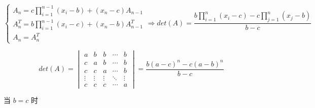 \begin{proposition}[两三角形行列式]
	$$\begin{cases}
	  A_{n} = c\prod\limits_{i=1}^{n-1}(x_{i}-b) + (x_{n} - c)A_{n-1}\\
	  A^{T}_{n} = b\prod\limits_{i=1}^{n-1}(x_{i}-c) + (x_{n} - b)A^{T}_{n-1}\\
	  A_{n} = A^{T}_{n}
	\end{cases}\Rightarrow 
	det(A) = \dfrac{b\prod\limits_{i=1}^{n}(x_{i}-c) - c\prod\limits_{j=1}^{n}(x_{j}-b)}{b-c}$$
\end{proposition}

\begin{proposition}
	$$det(A) = \begin{vmatrix}
		a      & b      & b      & \cdots & b\\
		c      & a      & b      & \cdots & b\\
		c      & c      & a      & \cdots & b\\
		\vdots & \vdots & \vdots & \ddots & \vdots\\
		c      & c      & c      & \cdots & a
	\end{vmatrix} = \dfrac{b(a-c)^{n} - c(a-b)^{n}}{b-c}$$

	当 $b = c$ 时 
	

\end{proposition}
